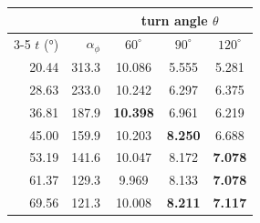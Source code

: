 \begin{tabular}{r r ccc}
  \toprule
  & & \multicolumn{3}{c}{turn angle $\theta$} \\
  \cmidrule(lr){3-5}
  $t$ (\si{\degree}) & $\alpha_\phi$ & $60^\circ$ & $90^\circ$ & $120^\circ$ \\
  \midrule
    20.44 & 313.3 & 10.086 & 5.555 & 5.281 \\
    28.63 & 233.0 & 10.242 & 6.297 & 6.375 \\
    36.81 & 187.9 & \textbf{10.398} & 6.961 & 6.219 \\
    45.00 & 159.9 & 10.203 & \textbf{8.250} & 6.688 \\
    53.19 & 141.6 & 10.047 & 8.172 & \textbf{7.078} \\
    61.37 & 129.3 & 9.969 & 8.133 & \textbf{7.078} \\
    69.56 & 121.3 & 10.008 & \textbf{8.211} & \textbf{7.117} \\
  \bottomrule
\end{tabular}

